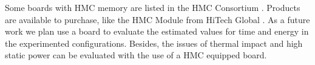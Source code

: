 \documentclass{sig-alternate-05-2015}
\begin{document}
Some boards with HMC memory are listed in the HMC Consortium \cite{HMCC_Resources}.
Products are available to purchase, like the HMC Module from HiTech Global \cite{HiTechGlobal_HMC}. As a future work we plan use a board to evaluate the estimated values for time and energy in the experimented
configurations. Besides, the issues of thermal impact and high static power can be evaluated with the use of a HMC equipped board.


%






%
%
\end{document}
